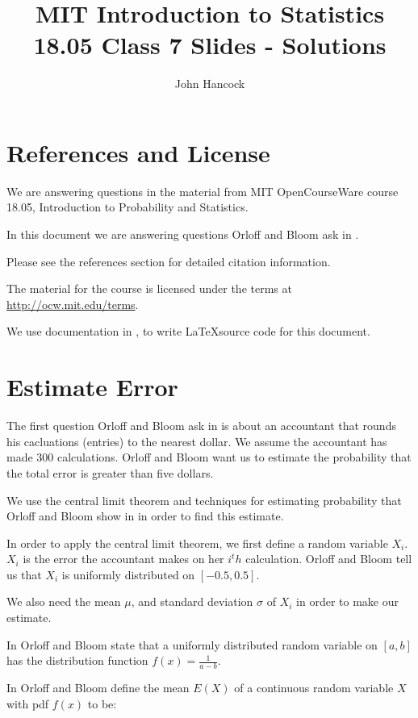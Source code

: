 \documentclass[a4paper,11pt]{article}
\author{John Hancock}
\title{MIT Introduction to Statistics 18.05 Class 7 Slides - Solutions}
\begin{document}
\maketitle
\tableofcontents
\section{References and License}
We are answering questions in the material from MIT OpenCourseWare
course 18.05, Introduction to Probability and Statistics.

In this document we are answering questions Orloff and Bloom ask in
\cite{slides7}.

Please see the references section for detailed citation information.

The material for the course is licensed under the terms at
\url{http://ocw.mit.edu/terms}.

We use documentation in  \cite{logicNot}, \cite{proofs} \cite{bars} to write
\LaTeX source code for this document.

\section{Estimate Error}
The first question Orloff and Bloom ask in \cite{slides7} is about an
accountant that rounds his cacluations (entries) to the nearest dollar.  We
assume the accountant has made 300 calculations.  Orloff and Bloom want us
to estimate the probability that the total error is greater than five
dollars.

We use the central limit theorem \cite{reading6b} and techniques for estimating
probability that Orloff and Bloom show in \cite{reading6b} in order to find
this estimate.

In order to apply the central limit theorem, we first define a random variable
$X_i$.  $X_i$ is the error the accountant makes on her $i^th$ calculation.
Orloff and Bloom tell us that $X_i$ is uniformly distributed on
$\left[-0.5, 0.5 \right]$.

We also need the mean $\mu$, and standard deviation $\sigma$ of $X_i$ in order
to make our estimate.

In \cite{reading5c} Orloff and Bloom state that a uniformly distributed random
variable on $\left[a, b \right]$ has the distribution function
$f\left(x \right) = \frac{1}{a-b}$.

In \cite{reading6a} Orloff and Bloom define the mean $E\left(X \right)$ of a
continuous random variable $X$ with pdf $f\left(x \right)$ to be:
\end{document}
